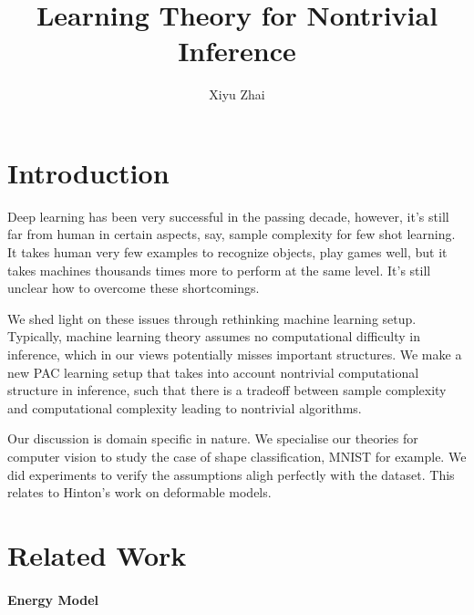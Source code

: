 \documentclass[11pt, oneside]{article}   	%
\title{Learning Theory for Nontrivial Inference}
\author{Xiyu Zhai}
\date{}							%
\theoremstyle{definition}
\begin{document}
\maketitle
\tableofcontents
{}

\section{Introduction}

Deep learning has been very successful in the passing decade, however, it's still far from human in certain aspects, say, sample complexity for few shot learning. It takes human very few examples to recognize objects, play games well, but it takes machines thousands times more to perform at the same level. It's still unclear how to overcome these shortcomings.

We shed light on these issues through rethinking machine learning setup. Typically, machine learning theory assumes no computational difficulty in inference, which in our views potentially misses important structures. We make a new PAC learning setup that takes into account nontrivial computational structure in inference, such that there is a tradeoff between sample complexity and computational complexity leading to nontrivial algorithms. 

Our discussion is domain specific in nature. We specialise our theories for computer vision to study the case of shape classification, MNIST for example. We did experiments to verify the assumptions aligh perfectly with the dataset. This relates to Hinton's work on deformable models.

\section{Related Work}

\paragraph{Energy Model}

\paragraph{}
\end{document}
